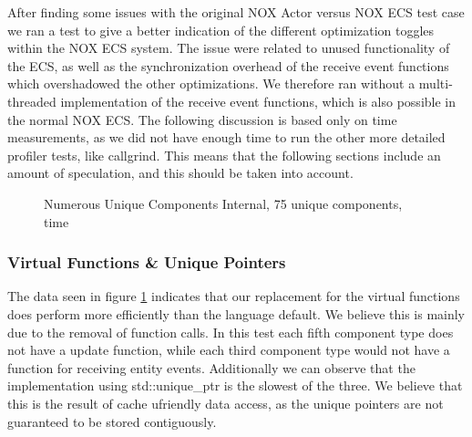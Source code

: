 After finding some issues with the original NOX Actor versus NOX ECS test case we ran a test to give a better indication of
the different optimization toggles within the NOX ECS system.
The issue were related to unused functionality of the ECS, as well as the synchronization overhead of the receive event functions
which overshadowed the other optimizations. We therefore ran without a multi-threaded implementation of the receive event functions,
which is also possible in the normal NOX ECS.
The following discussion is based only on time measurements, as we did not have enough time to
run the other more detailed profiler tests, like callgrind.
This means that the following sections include an amount of speculation, and this should be taken into account.

\begin{figure}[htb]
\centering
{}
\caption{Numerous Unique Components Internal, 75 unique components, time}
\label{fig:benchmarking_numerous_unique_75_internal_time_virtual}
\end{figure}

\todo{Ask simon if we should use logscale for the graphs}
\subsubsection{Virtual Functions \& Unique Pointers}
The data seen in figure \ref{fig:benchmarking_numerous_unique_75_internal_time_virtual} indicates that our replacement for the virtual functions
does perform more efficiently than the language default.
We believe this is mainly due to the removal of function calls.
In this test each fifth component type does not have a update function, while each third component type would not have a function
for receiving entity events.
Additionally we can observe that the implementation using std::unique\_ptr is the slowest of the three.
We believe that this is the result of cache ufriendly data access, as the unique pointers are not guaranteed to be stored contiguously.


